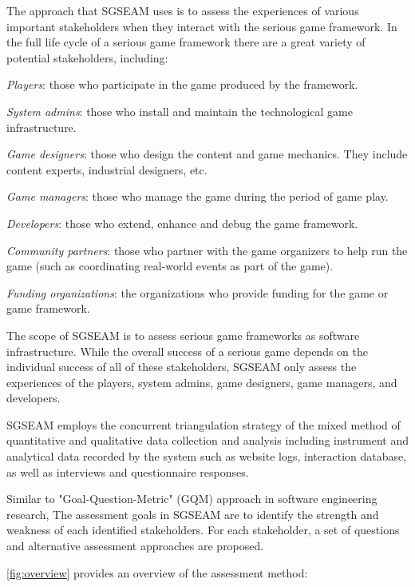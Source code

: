 \documentclass{sigchi}
\begin{document}
The approach that SGSEAM uses is to assess the experiences of various important stakeholders when
they interact with the serious game framework. In the full life cycle of a serious game framework
there are a great variety of potential stakeholders, including:

\begin{compactitem}
\item \emph{Players}: those who participate in the game produced by the framework.
\item \emph{System admins}: those who install and maintain the technological game infrastructure.
\item \emph{Game designers}: those who design the content and game mechanics. They include  content experts, industrial designers, etc.
\item \emph{Game managers}: those who manage the game during the period of game play.
\item \emph{Developers}: those who extend, enhance and debug the game framework.
\item \emph{Community partners}: those who partner with the game
  organizers to help run the game (such as coordinating real-world
  events as part of the game).
\item \emph{Funding organizations}: the organizations who provide
  funding for the game or game framework.
\end{compactitem}

The scope of SGSEAM is to assess serious game frameworks as software infrastructure. While
the overall success of a serious game depends on the individual success of all of these
stakeholders, SGSEAM only assess the experiences of the players, system admins, game designers, game managers, and developers.

SGSEAM employs the concurrent triangulation strategy \cite{creswell2003} of the mixed method of quantitative and qualitative data collection and analysis including instrument and
analytical data recorded by the system such as website logs, interaction database, as well
as interviews and questionnaire responses.

Similar to "Goal-Question-Metric" (GQM) approach \cite{caldiera1994goal} in
software engineering research, The assessment goals in SGSEAM are to identify the strength and weakness of each identified stakeholders. For each
stakeholder, a set of questions and alternative assessment approaches are
proposed.

\autoref{fig:overview} provides an overview of the assessment method:
\end{document}

